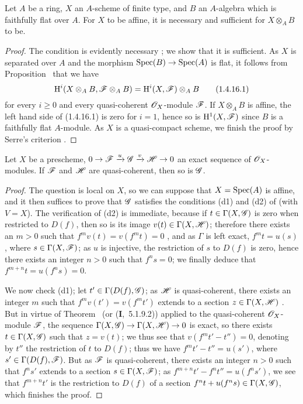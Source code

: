 \begin{cor}[1.4.16]
\label{3.1.4.16}
Let $A$ be a ring, $X$ an $A$-scheme of finite type, and $B$ an $A$-algebra which is faithfully flat over $A$.
For $X$ to be affine, it is necessary and sufficient for $X\otimes_A B$ to be.
\end{cor}

\begin{proof}
\label{proof-3.1.4.16}
The condition is evidently necessary ; we show that it is sufficient.
As $X$ is separated over $A$ and the morphism $\Spec(B)\to\Spec(A)$ is flat, it follows from Proposition~ that we have
\[
  \mathrm{H}^i(X\otimes_A B,\mathscr{F}\otimes_A B)=\mathrm{H}^i(X,\mathscr{F})\otimes_A B
  \tag{1.4.16.1}
\]
for every $i\geq 0$ and every quasi-coherent $\mathscr{O}_X$-module $\mathscr{F}$.
If $X\otimes_A B$ is affine, the left hand side of (1.4.16.1) is zero for $i=1$, hence so is $\mathrm{H}^1(X,\mathscr{F})$ since $B$ is a faithfully flat $A$-module.
As $X$ is a quasi-compact scheme, we finish the proof by Serre's criterion .
\end{proof}

\begin{prop}[1.4.17]
\label{3.1.4.17}
Let $X$ be a prescheme, $0\to\sh{F}\xrightarrow{u}\sh{G}\xrightarrow{v}\sh{H}\to 0$ an exact sequence of $\mathscr{O}_X$-modules.
If $\mathscr{F}$ and $\mathscr{H}$ are quasi-coherent, then so is $\mathscr{G}$.
\end{prop}

\begin{proof}
\label{proof-3.1.4.17}
The question is local on $X$, so we can suppose that $X={\mathop{\mathrm{Spec}}\nolimits}(A)$ is affine, and it then suffices to prove that $\mathscr{G}$ satisfies the conditions (d1) and (d2) of  (with $V=X$).
The verification of (d2) is immediate, because if $t\in\Gamma(X,\mathscr{G})$ is zero when restricted to $D(f)$, then so is its image $v(t)\in\Gamma(X,\mathscr{H})$; therefore there exists an $m>0$ such that $f^m v(t)=v(f^m t)=0$ , and as $\Gamma$ is left exact, $f^m t=u(s)$, where $s\in\Gamma(X,\mathscr{F})$; as $u$ is injective, the restriction of $s$ to $D(f)$ is zero, hence  there exists an integer $n>0$ such that $f^n s=0$; we finally deduce that $f^{m+n}t=u(f^n s)=0$.

We now check (d1); let $t'\in\Gamma(D(f),\mathscr{G})$; as $\mathscr{H}$ is quasi-coherent, there exists an integer $m$ such that $f^m v(t')=v(f^m t')$ extends to a section $z\in\Gamma(X,\mathscr{H})$ .
But in virtue of Theorem~ (or (\textbf{I},~5.1.9.2)) applied to the quasi-coherent $\mathscr{O}_X$-module $\mathscr{F}$, the sequence $\Gamma(X,\sh{G})\to\Gamma(X,\sh{H})\to 0$ is exact, so there exists $t\in\Gamma(X,\mathscr{G})$ such that $z=v(t)$; we thus see that $v(f^m t'-t'')=0$, denoting by $t''$ the restriction of $t$ to $D(f)$; thus we have $f^m t'-t''=u(s')$, where $s'\in\Gamma(D(f),\mathscr{F})$.
But as $\mathscr{F}$ is quasi-coherent, there exists an integer $n>0$ such that $f^n s'$ extends to a section $s\in\Gamma(X,\mathscr{F})$; as $f^{m+n}t'-f^n t''=u(f^n s')$, we see that $f^{m+n}t'$ is the restriction to $D(f)$ of a section $f^n t+u(f^n s)\in\Gamma(X,\mathscr{G})$, which finishes the proof.
\end{proof}


